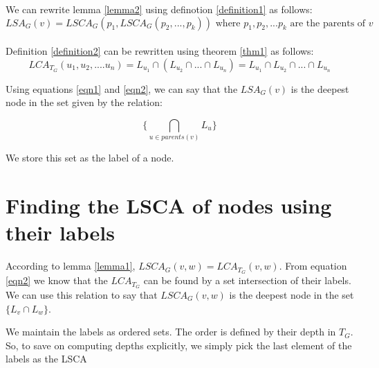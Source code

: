 \documentclass{paper}
\begin{document}
We can rewrite lemma \ref{lemma2} using definotion \ref{definition1} as follows:
\begin{equation}\label{eqn1}
LSA_G(v) = LSCA_G (p_1, LSCA_G (p_2,...,p_k))
\text{ where } p_1, p_2, ... p_k \text{ are the parents of } v
\end{equation} \\

Definition \ref{definition2} can be rewritten using theorem \ref{thm1} as follows:
\begin{equation}\label{eqn2}
	LCA_{T_G} (u_1, u_2, .... u_n) = L_{u_1} \cap (L_{u_2} \cap ... \cap L_{u_n}) = L_{u_1} \cap L_{u_2} \cap ... \cap L_{u_n}
\end{equation}


Using equations \ref{eqn1} and \ref{eqn2}, we can say that the $LSA_G(v)$ is the deepest node in the set given by the relation:

\[
\{ \bigcap_{u\in parents(v)} L_u\}
\]


We store this set as the label of a node.

\section{Finding the LSCA of nodes using their labels}

According to lemma \ref{lemma1}, $LSCA_G(v,w) = LCA_{T_G}(v,w)$. From equation \ref{eqn2} we know that the $LCA_{T_G}$ can be found by a set intersection of their labels. We can use this relation to say that $LSCA_G(v,w)$ is the deepest node in the set $\{L_v \cap L_w\}$.

We maintain the labels as ordered sets. The order is defined by their depth in $T_G$. So, to save on computing depths explicitly, we simply pick the last element of the labels as the LSCA
\end{document}

